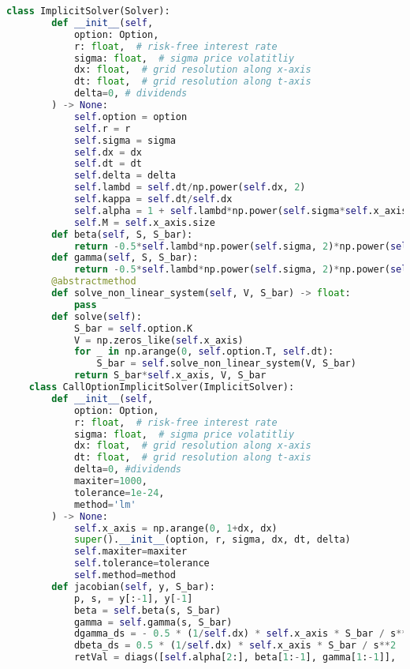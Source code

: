 \begin{lstlisting}[language=Python, caption=Implicit solver for Nielsen transformation]
    class ImplicitSolver(Solver):
        def __init__(self, 
            option: Option,
            r: float,  # risk-free interest rate
            sigma: float,  # sigma price volatitliy
            dx: float,  # grid resolution along x-axis
            dt: float,  # grid resolution along t-axis
            delta=0, # dividends
        ) -> None:
            self.option = option
            self.r = r
            self.sigma = sigma
            self.dx = dx
            self.dt = dt
            self.delta = delta
            self.lambd = self.dt/np.power(self.dx, 2)
            self.kappa = self.dt/self.dx
            self.alpha = 1 + self.lambd*np.power(self.sigma*self.x_axis, 2) + self.r*self.dt
            self.M = self.x_axis.size 
        def beta(self, S, S_bar):
            return -0.5*self.lambd*np.power(self.sigma, 2)*np.power(self.x_axis, 2) + 0.5*self.kappa*self.x_axis*((self.r-self.delta) - (S_bar - S)/(self.dt*S))
        def gamma(self, S, S_bar):
            return -0.5*self.lambd*np.power(self.sigma, 2)*np.power(self.x_axis, 2) - 0.5*self.kappa*self.x_axis*((self.r-self.delta) - (S_bar - S)/(self.dt*S))
        @abstractmethod
        def solve_non_linear_system(self, V, S_bar) -> float:
            pass
        def solve(self):
            S_bar = self.option.K
            V = np.zeros_like(self.x_axis)
            for _ in np.arange(0, self.option.T, self.dt):
                S_bar = self.solve_non_linear_system(V, S_bar)
            return S_bar*self.x_axis, V, S_bar
    class CallOptionImplicitSolver(ImplicitSolver):
        def __init__(self, 
            option: Option,
            r: float,  # risk-free interest rate
            sigma: float,  # sigma price volatitliy
            dx: float,  # grid resolution along x-axis
            dt: float,  # grid resolution along t-axis
            delta=0, #dividends
            maxiter=1000,
            tolerance=1e-24,
            method='lm'
        ) -> None:
            self.x_axis = np.arange(0, 1+dx, dx)
            super().__init__(option, r, sigma, dx, dt, delta)
            self.maxiter=maxiter
            self.tolerance=tolerance
            self.method=method
        def jacobian(self, y, S_bar):
            p, s, = y[:-1], y[-1]
            beta = self.beta(s, S_bar)
            gamma = self.gamma(s, S_bar)
            dgamma_ds = - 0.5 * (1/self.dx) * self.x_axis * S_bar / s**2
            dbeta_ds = 0.5 * (1/self.dx) * self.x_axis * S_bar / s**2
            retVal = diags([self.alpha[2:], beta[1:-1], gamma[1:-1]],

\end{lstlisting}
